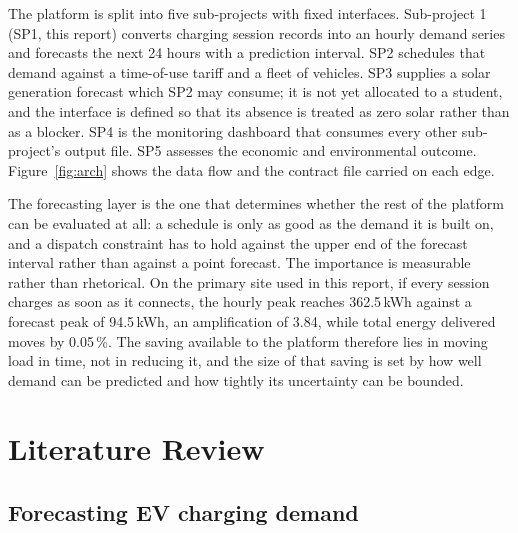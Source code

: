 \documentclass[10pt,a4paper]{article}
\begin{document}
The platform is split into five sub-projects with fixed interfaces. Sub-project 1 (SP1, this
report) converts charging session records into an hourly demand series and forecasts the next 24
hours with a prediction interval. SP2 schedules that demand against a time-of-use tariff and a
fleet of vehicles. SP3 supplies a solar generation forecast which SP2 may consume; it is not yet
allocated to a student, and the interface is defined so that its absence is treated as zero solar
rather than as a blocker. SP4 is the monitoring dashboard that consumes every other sub-project's
output file. SP5 assesses the economic and environmental outcome. Figure~\ref{fig:arch} shows the
data flow and the contract file carried on each edge.

The forecasting layer is the one that determines whether the rest of the platform can be evaluated
at all: a schedule is only as good as the demand it is built on, and a dispatch constraint has to
hold against the upper end of the forecast interval rather than against a point forecast. The
importance is measurable rather than rhetorical. On the primary site used in this report, if every
session charges as soon as it connects, the hourly peak reaches 362.5\,kWh against a forecast peak
of 94.5\,kWh, an amplification of 3.84, while total energy delivered moves by 0.05\,\%. The saving
available to the platform therefore lies in moving load in time, not in reducing it, and the size
of that saving is set by how well demand can be predicted and how tightly its uncertainty can be
bounded.


\section{Literature Review}

\subsection{Forecasting EV charging demand}
\end{document}
